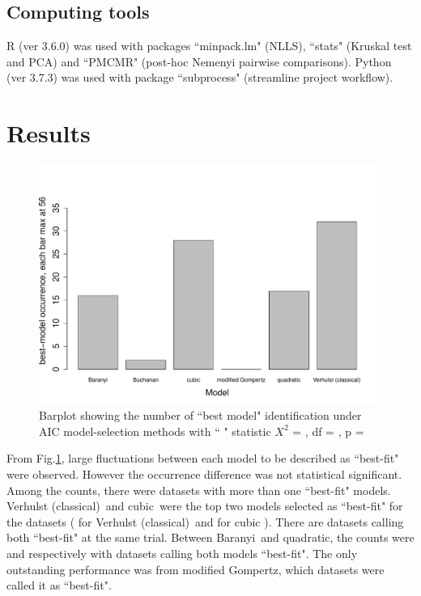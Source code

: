 \documentclass[a4paper, 11pt]{article}
\newcommand{\fve}{Verhulst (classical)}
\newcommand{\fgo}{modified Gompertz}
\newcommand{\fba}{Baranyi}
\newcommand{\fqu}{quadratic}
\newcommand{\fcu}{cubic}
\begin{document}
	\subsection*{Computing tools}
	R (ver 3.6.0)\autocite{Rcore} was used with packages ``minpack.lm"\autocite{minpacklm} (NLLS), ``stats"\autocite{Rcore} (Kruskal test and PCA) and ``PMCMR"\autocite{PMCMR} (post-hoc Nemenyi pairwise comparisons).  Python (ver 3.7.3)\autocite{py3} was used with package ``subprocess"\autocite{py3} (streamline project workflow).
	
	\section*{Results}
	\begin{figure}[H]
		\centering
		\includegraphics[width=.8\linewidth]{../results/barplot_BestModel.pdf}
		\caption{Barplot showing the number of ``best model" identification under AIC model-selection methods with ``
			" statistic $X^{2}$ = 
			, df = 
			, p = 
		}\label{barPT}
	\end{figure}
	From Fig.\ref{barPT}, large fluctuations between each model to be described as ``best-fit" were observed.  However the occurrence difference was not statistical significant.  Among the counts, there were 
	datasets with more than one ``best-fit" models.  \fve\ and \fcu\ were the top two models selected as ``best-fit" for the 
	 datasets (
	  for \fve\ and 
	  for \fcu
	 ).  There are 
	  datasets calling both ``best-fit" at the same trial.  Between \fba\ and \fqu, the counts were 
	  and 
	  respectively with 
	 datasets calling both models ``best-fit".  The only outstanding performance was from \fgo, which 
	  datasets were called it as ``best-fit".
	  
\end{document}
